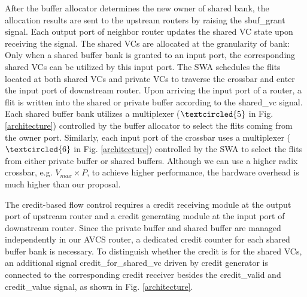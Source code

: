\documentclass[10pt,conference]{IEEEtran}
\begin{document}
After the buffer allocator determines the new owner of shared bank, the allocation results are sent to the upstream routers by raising the sbuf\_grant signal. Each output port of neighbor router updates the shared VC state upon receiving the signal. The shared VCs are allocated at the granularity of bank: Only when a shared buffer bank is granted to an input port, the corresponding shared VCs can be utilized by this input port. The SWA schedules the flits located at both shared VCs and private VCs to traverse the crossbar and enter the input port of downstream router. Upon arriving the input port of a router, a flit is written into the shared or private buffer according to the shared\_vc signal. Each shared buffer bank utilizes a multiplexer ($\textcircled{5}$ in Fig. \ref{architecture}) controlled by the buffer allocator to select the flits coming from the owner port. Similarly, each input port of the crossbar uses a multiplexer ($\textcircled{6}$ in Fig. \ref{architecture}) controlled by the SWA to select the flits from either private buffer or shared buffers. Although we can use a higher radix crossbar, e.g. $V_{max}\times P$, to achieve higher performance, the hardware overhead is much higher than our proposal.

The credit-based flow control requires a credit receiving module at the output port of upstream router and a credit generating module at the input port of downstream router. Since the private buffer and shared buffer are managed independently in our AVCS router, a dedicated credit counter for each shared buffer bank is necessary. To distinguish whether the credit is for the shared VCs, an additional signal credit\_for\_shared\_vc driven by credit generator is connected to the corresponding credit receiver besides the credit\_valid and credit\_value signal, as shown in Fig. \ref{architecture}.

\end{document}
